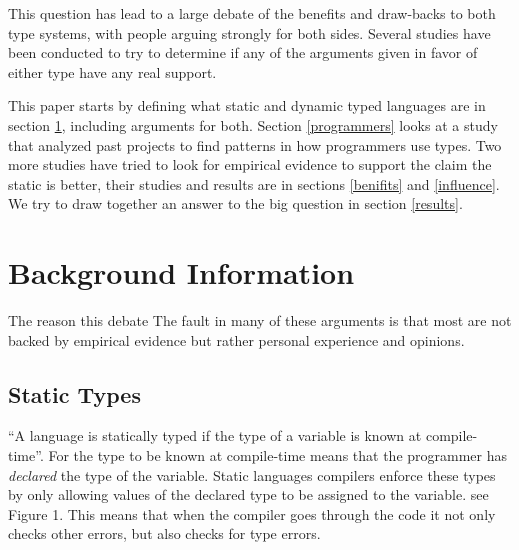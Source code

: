 \documentclass{sig-alternate}
\begin{document}
This question has lead to a large debate of the benefits and draw-backs to both type systems, with people arguing strongly for both sides. Several studies have been conducted to try to determine if any of the arguments given in favor of either type have any real support. 

This paper starts by defining what static and dynamic typed languages are in section \ref{types}, including arguments for both. Section \ref{programmers} looks at a study that analyzed past projects to find patterns in how programmers use types. Two more studies have tried to look for empirical evidence to support the claim the static is better, their studies and results are in sections \ref{benifits} and \ref{influence}. We try to draw together an answer to the big question in section \ref{results}.

\section{Background Information}\label{types}
The reason this debate 
The fault in many of these arguments is that most are not backed by empirical evidence but rather personal experience and opinions.

\subsection{Static Types}\label{static}
``A language is statically typed if the type of a variable is known at compile-time''\cite{NomeN2009}. For the type to be known at compile-time means that the programmer has \emph{declared} the type of the variable. Static languages compilers enforce these types by only allowing values of the declared type to be assigned to the variable. see Figure 1. This means that when the compiler goes through the code it not only checks other errors, but also checks for type errors.
 
\end{document}
